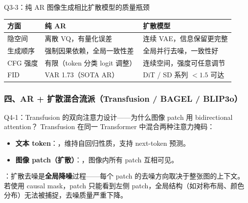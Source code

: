 \begin{conceptbox}{Q3-3：纯 AR 图像生成相比扩散模型的质量瓶颈}
\begin{center}
\small
\begin{tabular}{|l|l|l|}
\hline
\textbf{方面} & \textbf{纯 AR} & \textbf{扩散模型} \\
\hline
隐空间 & 离散 VQ，有量化误差 & 连续 VAE，信息保留更完整 \\
生成顺序 & 强制因果依赖，全局一致性差 & 全局并行去噪，一致性好 \\
CFG 强度 & 有限（token 分类 logit 调整） & 连续空间，强度可任意调节 \\
FID & VAR 1.73（SOTA AR） & DiT / SD 系列 $<1.5$ 可达 \\
\hline
\end{tabular}
\end{center}
\end{conceptbox}

\subsubsection{四、AR + 扩散混合流派（Transfusion / BAGEL / BLIP3o）}

\begin{conceptbox}{Q4-1：Transfusion 的双向注意力设计——为什么图像 patch 用 bidirectional attention？}
Transfusion 在同一 Transformer 中混合两种注意力掩码：
\begin{itemize}
  \item \textbf{文本 token}：，维持自回归性质，支持 next-token 预测。
  \item \textbf{图像 patch（扩散）}：，图像内所有 patch 互相可见。
\end{itemize}
：扩散去噪是\textbf{全局降噪}过程——每个 patch 的去噪方向取决于整张图的上下文。若使用 causal mask，patch 只能看到左侧 patch，全局结构（如对称布局、颜色分布）无法被捕捉，去噪质量严重下降。

\end{conceptbox}

